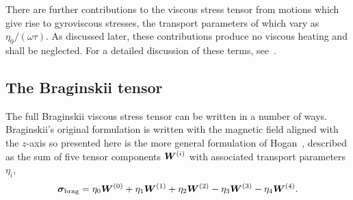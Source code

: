 There are further contributions to the viscous stress tensor from motions which give rise to gyroviscous stresses, the transport parameters of which vary as $\eta_0 / (\omega \tau)$. As discussed later, these contributions produce no viscous heating and shall be neglected. For a detailed discussion of these terms, see~\cite{kaufmanPlasmaViscosityMagnetic1960}.

\subsection{The Braginskii tensor}

\label{sec:braginskii_tensor}

The full Braginskii viscous stress tensor can be written in a number of ways. Braginskii's original formulation is written with the magnetic field aligned with the $z$-axis so presented here is the more general formulation of Hogan~\cite{hoganCollisionalTransportMomentum1984}, described as the sum of five tensor components ${\bm W}^{(i)}$ with associated transport parameters $\eta_i$,
\begin{equation}
\label{eq:braginskii_tensor}
{\bm \sigma}_{\text{brag}} = \eta_0 {\bm W}^{(0)} + \eta_1 {\bm W}^{(1)} + \eta_2 {\bm W}^{(2)} - \eta_3 {\bm W}^{(3)} - \eta_4 {\bm W}^{(4)}.
\end{equation}

